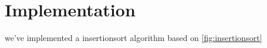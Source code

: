 \section{Implementation}

we've implemented a insertionsort algorithm based on \ref{fig:insertionsort}
\begin{lstlisting}

\end{lstlisting}
